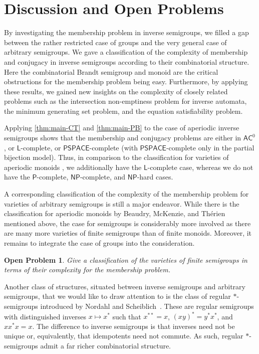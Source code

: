 \documentclass[anonymous,letter,UKenglish,cleveref,autoref,thm-restate]{lipics-v2021}
\newcommand{\Ptime}{\ensuremath{\mathsf{P}}\xspace}
\newcommand{\ACz}{\ensuremath{\mathsf{AC}^0}\xspace}
\newcommand{\LOGSPACE}{\ensuremath{\mathsf{L}}\xspace}
\newcommand{\NP}{\ensuremath{\mathsf{NP}}\xspace}
\newcommand{\PSPACE}{\ensuremath{\mathsf{PSPACE}}\xspace}
\theoremstyle{plain}
\newtheorem{problem}[theorem]{Open Problem}
\theoremstyle{plain}
\begin{document}
\section{Discussion and Open Problems}\label{sec:discussion}

By investigating the membership problem in inverse semigroups, we filled a gap between the rather restricted case of groups and the very general case of arbitrary semigroups.
We gave a classification of the complexity of membership and conjugacy in inverse semigroups according to their combinatorial structure.
Here the combinatorial Brandt semigroup and monoid are the critical obstructions for the membership problem being easy.
Furthermore, by applying these results, we gained new insights on the complexity of closely related problems such as the intersection non-emptiness problem for inverse automata, the minimum generating set problem, and the equation satisfiability problem.

Applying \cref{thm:main-CT} and \cref{thm:main-PB} to the case of aperiodic inverse semigroups shows that the membership and conjugacy problems are either in \ACz, or \LOGSPACE-complete, or \PSPACE-complete (with \PSPACE-complete only in the partial bijection model).
Thus, in comparison to the classification for varieties of aperiodic monoids \cite{BeaudryMT92}, we additionally have the \LOGSPACE-complete case, whereas we do not have the \Ptime-complete, \NP-complete, and \NP-hard cases.

A corresponding classification of the complexity of the membership problem for varieties of arbitrary semigroups is still a major endeavor.
While there is the classification for aperiodic monoids by Beaudry, McKenzie, and Thérien~\cite{BeaudryMT92} mentioned above, the case for semigroups is considerably more involved as there are many more varieties of finite semigroups than of finite monoids.
Moreover, it remains to integrate the case of groups into the consideration.
\begin{problem}
	Give a classification of the varieties of finite semigroups in terms of their complexity for the membership problem.
\end{problem}

Another class of structures, situated between inverse semigroups and arbitrary semigroups, that we would like to draw attention to is the class of regular $\ast$-semigroups introduced by Nordahl and Scheiblich~\cite{NordahlScheiblich78}.
These are regular semigroups with distinguished inverses $x \mapsto x^\ast$ such that $x^{\ast\ast} = x$, $(xy)^\ast = y^\ast x^\ast$, and $x x^\ast x = x$.
The difference to inverse semigroups is that inverses need not be unique or, equivalently, that idempotents need not commute. 
As such, regular $\ast$-semigroups admit a far richer combinatorial structure.
\end{document}
